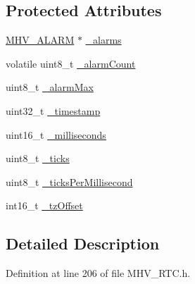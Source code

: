 \subsection*{\-Protected \-Attributes}
\begin{DoxyCompactItemize}
\item 
\hyperlink{_m_h_v___r_t_c_8h_af13307658f41fba330ffae04dd5cbce6}{\-M\-H\-V\-\_\-\-A\-L\-A\-R\-M} $\ast$ \hyperlink{class_m_h_v___r_t_c_afaaed6deea21b52f8bde5f8ebc0abf70}{\-\_\-alarms}
\item 
volatile uint8\-\_\-t \hyperlink{class_m_h_v___r_t_c_a953a79952c9fa5fde5d1dacbc03d3b46}{\-\_\-alarm\-Count}
\item 
uint8\-\_\-t \hyperlink{class_m_h_v___r_t_c_aed7d37466a99362b78dd9ccf1390d35c}{\-\_\-alarm\-Max}
\item 
uint32\-\_\-t \hyperlink{class_m_h_v___r_t_c_a6ac0d6f1b8985cd6113249693da50104}{\-\_\-timestamp}
\item 
uint16\-\_\-t \hyperlink{class_m_h_v___r_t_c_acd3e486b5e5ee1d8cf9d961c0fdbde57}{\-\_\-milliseconds}
\item 
uint8\-\_\-t \hyperlink{class_m_h_v___r_t_c_ab29c30f80f7234394299476c73f36baf}{\-\_\-ticks}
\item 
uint8\-\_\-t \hyperlink{class_m_h_v___r_t_c_a48e7d03e90e78881ed8833d6e4f77b36}{\-\_\-ticks\-Per\-Millisecond}
\item 
int16\-\_\-t \hyperlink{class_m_h_v___r_t_c_af9e544307713892ec196261247213490}{\-\_\-tz\-Offset}
\end{DoxyCompactItemize}


\subsection{\-Detailed \-Description}


\-Definition at line 206 of file \-M\-H\-V\-\_\-\-R\-T\-C.\-h.



